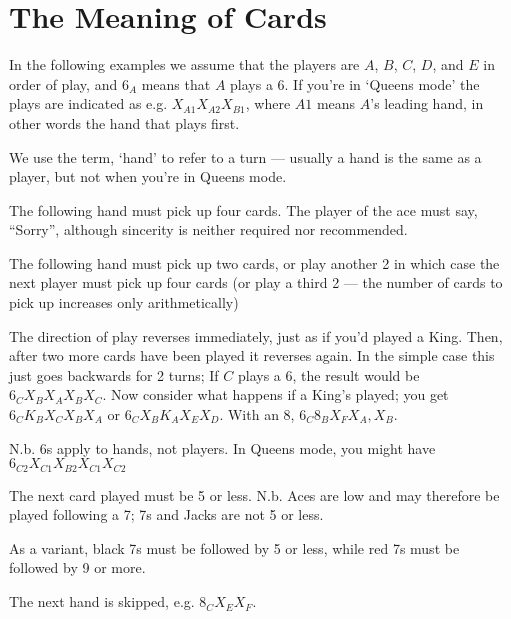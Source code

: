 \documentclass[12pt]{article}
\begin{document}
\section{The Meaning of Cards}
\label{specialCards}

In the following examples we assume that the players are $A$, $B$, $C$, $D$, and $E$ in order of play,
and $6_A$ means that $A$ plays a 6.  If you're in `Queens mode' the plays are indicated as e.g. $X_{A1} X_{A2} X_{B1}$,
where $A1$ means $A$'s leading hand, in other words the hand that plays first.

We use the term, `hand' to refer to a turn --- usually a hand is the same as a player, but not when
you're in Queens mode.

\begin{description}
\newcommand{\card}[1]{\hbox to 15mm{#1\hfil}}
\item[\card{Ace}]
  The following hand must pick up four cards.  The player of the ace must say, ``Sorry'', although sincerity is neither required nor recommended.

  \item[\card{2}]
    The following hand must pick up two cards, or play another 2 in which case the next player must
    pick up four cards (or play a third 2 --- the number of cards to pick up increases only arithmetically)

  \item[\card{6}]
    The direction of play reverses immediately, just as if you'd played a King.  Then, after two
    more cards have been played it reverses again.  In the simple case this just goes backwards
    for 2 turns; If $C$ plays
    a 6, the result would be $6_C X_B X_A X_B X_C$.  Now consider what happens if a
    King's played;  you get $6_C K_B X_C X_B X_A$ or $6_C X_B K_A X_E X_D$.  With an 8,
    $6_C 8_B X_F X_A, X_B$.

    N.b. 6s apply to hands, not players.  In Queens mode, you might have $6_{C2} X_{C1} X_{B2} X_{C1} X_{C2}$

  \item[\card{7}]
    The next card played must be 5 or less.  N.b. Aces are low and may therefore be played following a 7;
    7s and Jacks are not 5 or less.

    As a variant, black 7s must be followed by 5 or less, while red 7s must be followed by 9 or more.

  \item[\card{8}]
    The next hand is skipped, e.g. $8_C X_E X_F$.


\end{description}
\end{document}
